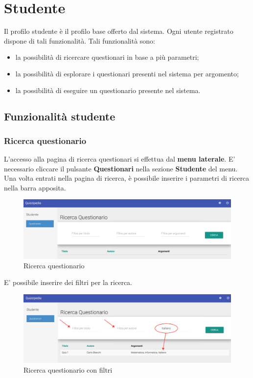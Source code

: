 \documentclass[12pt,a4paper]{article}
\begin{document}
	\newpage

	\section{Studente}\label{studente}
	Il profilo studente è il profilo  base offerto dal sistema. Ogni utente registrato dispone di tali funzionalità. Tali funzionalità sono:
	\begin{itemize}
		\item la possibilità di ricercare questionari in base a più parametri;
		\item la possibilità di esplorare i questionari presenti nel sistema per argomento;
		\item la possibilità di eseguire un questionario presente nel sistema.
	\end{itemize}
	
	\subsection{Funzionalità studente}
	\subsubsection{Ricerca questionario}\label{ricerca_questionario}
	L'accesso alla pagina di ricerca questionari si effettua dal \textbf{menu laterale}. 
	E' necessario cliccare il pulsante \textbf{Questionari} nella sezione \textbf{Studente} del menu.
	Una volta entrati nella pagina di ricerca, è possibile inserire i parametri di ricerca nella barra apposita.
	
	\begin{figure}[H]	
		\centering
		\includegraphics[width=1.0\linewidth]{../img/screenshot/ricercaQuestionario.png}
		\caption{Ricerca questionario}
		\label{Ricerca questionario}
	\end{figure}
	
	E' possibile inserire dei filtri per la ricerca. 
	
	\begin{figure}[H]		
		\centering
		\includegraphics[width=1.0\linewidth]{../img/screenshot/filtriRicerca.png}
		\caption{Ricerca questionario con filtri}
		\label{Ricerca questionario con filtri}
	\end{figure}
	
\end{document}
